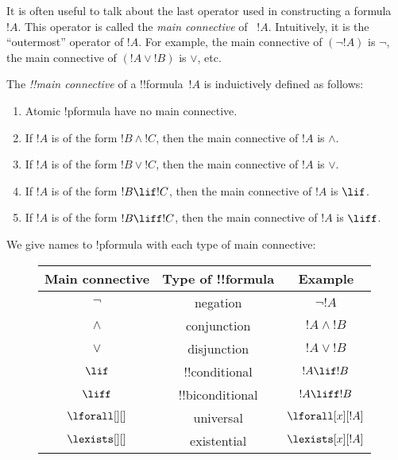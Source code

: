 \documentclass[../../include/open-logic-section]{subfiles}
\begin{document}


\begin{explain}
It is often useful to talk about the last operator used in
constructing a formula~$!A$.  This operator is called the \emph{main
  connective} of ~$!A$. Intuitively, it is the ``outermost'' operator
of $!A$. For example, the main connective of $(\lnot !A)$ is $\lnot$,
the main connective of $(!A \lor !B)$ is $\lor$, etc.
\end{explain}


\begin{defn}
The \emph{!!{main connective}} of a !!{formula}~$!A$ is induictively
defined as follows:
\begin{enumerate}
\item Atomic !p{formula} have no main connective.
\item If $!A$ is of the form $!B \land !C$, then the main connective of
  $!A$ is $\land$.
\item If $!A$ is of the form $!B \lor !C$, then the main connective of
  $!A$ is $\lor$.
\item If $!A$ is of the form $!B \lif !C$, then the main connective of
  $!A$ is $\lif$.
\item If $!A$ is of the form $!B \liff !C$, then the main connective of
  $!A$ is $\liff$.
\end{enumerate}
\end{defn}

We give names to !p{formula} with each type of main connective:

\begin{figure}[!h]
\centering
\begin{tabular}{| c | c | c |}
\hline
Main connective & Type of !!{formula} & Example\\
\hline
$\lnot$ & negation & $\lnot !A$ \\
$\land$ & conjunction & $!A \land !B$ \\
$\lor$ & disjunction & $!A \lor !B$ \\
$\lif$ & !!{conditional} & $!A \lif !B$ \\
$\liff$ & !!{biconditional} & $!A \liff !B$ \\
$\lforall[][]$ & universal & $\lforall[x][!A]$ \\
$\lexists[][]$ & existential & $\lexists[x][!A]$\\ \hline
\end{tabular}
\end{figure}
\end{document}
